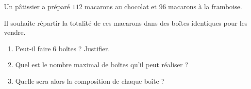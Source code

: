 \begin{exo}{}
	Un pâtissier a préparé $112$ macarons au chocolat et $96$ macarons à la framboise.

	Il souhaite répartir la totalité de ces macarons dans des boîtes identiques pour les vendre.
	\begin{enumerate}
		\item Peut-il faire $6$ boîtes ? Justifier.
		\item Quel est le nombre maximal de boîtes qu'il peut réaliser ?
		\item Quelle sera alors la composition de chaque boîte ?
	\end{enumerate}
\end{exo}
